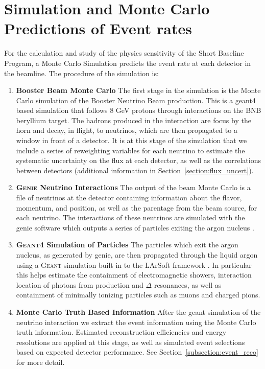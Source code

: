 \section{Simulation and Monte Carlo Predictions of Event rates}

For the calculation and study of the physics sensitivity of the Short Baseline Program, a Monte Carlo Simulation predicts the event rate at each detector in the beamline.  The procedure of the simulation is:

\begin{enumerate}

  \item {\bf Booster Beam Monte Carlo} The first stage in the simulation is the Monte Carlo simulation of the Booster Neutrino Beam production. This is a geant4 based simulation that follows 8 GeV protons through interactions on the BNB beryllium target. The hadrons produced in the interaction are focus by the horn and decay, in flight, to neutrinos, which are then propagated to a window in front of a detector. It is at this stage of the simulation that we include a series of reweighting variables for each neutrino to estimate the systematic uncertainty on the flux at each detector, as well as the correlations between detectors (additional information in Section~\ref{section:flux_uncert}).

  \item {\bf \textsc{Genie} Neutrino Interactions} The output of the beam Monte Carlo is a file of neutrinos at the detector containing information about the flavor, momentum, and position, as well as the parentage from the beam source, for each neutrino. The interactions of these neutrinos are simulated with the genie software which outputs a series of particles exiting the argon nucleus \cite{Andreopoulos:2009rq}. 

  \item {\bf \textsc{Geant4} Simulation of Particles} The particles which exit the argon nucleus, as generated by genie, are then propagated through the liquid argon using a \textsc{Geant} \cite{Agostinelli:2002hh} simulation built in to the LArSoft framework \cite{Church:2013hea}. In particular this helps estimate the containment of electromagnetic showers, interaction location of photons from \pizero production and $\Delta$ resonances, as well as containment of minimally ionizing particles such as muons and charged pions.

  \item {\bf Monte Carlo Truth Based Information}  After the geant simulation of the neutrino interaction we extract the event information using the Monte Carlo truth information. Estimated reconstruction efficiencies and energy resolutions are applied at this stage, as well as simulated event selections based on expected detector performance.  See Section~\ref{subsection:event_reco} for more detail.

\end{enumerate}


